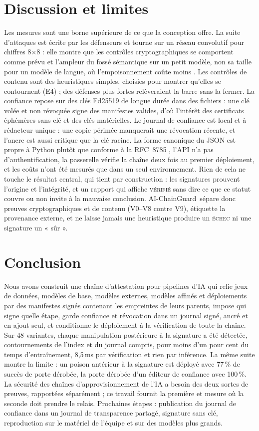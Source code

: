 \documentclass[conference]{IEEEtran}
\newcommand{\sys}{AI-ChainGuard}
\newcommand{\st}[1]{\textsc{#1}}
\begin{document}
\section{Discussion et limites}\label{sec:discussion}
Les mesures sont une borne supérieure de ce que la conception offre. La suite d'attaques est écrite par les défenseurs et tourne sur un réseau convolutif pour chiffres 8$\times$8 : elle montre que les contrôles cryptographiques se comportent comme prévu et l'ampleur du fossé sémantique sur un petit modèle, non sa taille pour un modèle de langue, où l'empoisonnement coûte moins \cite{souly2025}. Les contrôles de contenu sont des heuristiques simples, choisies pour montrer qu'elles se contournent (E4) ; des défenses plus fortes \cite{neuralcleanse,strip,spectral,activation} relèveraient la barre sans la fermer. La confiance repose sur des clés Ed25519 de longue durée dans des fichiers : une clé volée et non révoquée signe des manifestes valides, d'où l'intérêt des certificats éphémères sans clé \cite{sigstore2022} et des clés matérielles. Le journal de confiance est local et à rédacteur unique : une copie périmée manquerait une révocation récente, et l'ancre est aussi critique que la clé racine. La forme canonique du JSON est propre à Python plutôt que conforme à la RFC~8785 \cite{rfc8785}, l'API n'a pas d'authentification, la passerelle vérifie la chaîne deux fois au premier déploiement, et les coûts n'ont été mesurés que dans un seul environnement. Rien de cela ne touche le résultat central, qui tient par construction : les signatures prouvent l'origine et l'intégrité, et un rapport qui affiche \st{vérifié} sans dire ce que ce statut couvre ou non invite à la mauvaise conclusion. \sys\ sépare donc preuves cryptographiques et de contenu (V0--V8 contre V9), étiquette la provenance externe, et ne laisse jamais une heuristique produire un \st{échec} ni une signature un « sûr ».

\section{Conclusion}
Nous avons construit une chaîne d'attestation pour pipelines d'IA qui relie jeux de données, modèles de base, modèles externes, modèles affinés et déploiements par des manifestes signés contenant les empreintes de leurs parents, impose qui signe quelle étape, garde confiance et révocation dans un journal signé, ancré et en ajout seul, et conditionne le déploiement à la vérification de toute la chaîne. Sur 48 variantes, chaque manipulation postérieure à la signature a été détectée, contournements de l'index et du journal compris, pour moins d'un pour cent du temps d'entraînement, 8,5\,ms par vérification et rien par inférence. La même suite montre la limite : un poison antérieur à la signature est déployé avec 77\,\% de succès de porte dérobée, la porte dérobée d'un éditeur de confiance avec 100\,\%. La sécurité des chaînes d'approvisionnement de l'IA a besoin des deux sortes de preuves, rapportées séparément ; ce travail fournit la première et mesure où la seconde doit prendre le relais. Prochaines étapes : publication du journal de confiance dans un journal de transparence partagé, signature sans clé, reproduction sur le matériel de l'équipe et sur des modèles plus grands.
\end{document}
